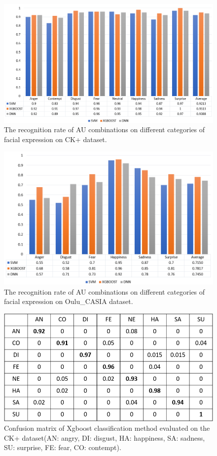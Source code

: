 \documentclass[10pt, conference, compsocconf]{IEEEtran}
\begin{document}
\begin{figure}[h]
	\centering
	\includegraphics[width=\linewidth]{figureck}
	\caption{The recognition rate of AU combinations on different categories of facial expression on CK+ dataset.}
\end{figure}
\begin{figure}[h]
	\centering
	\includegraphics[width=\linewidth]{figureoulu}
	\caption{The recognition rate of AU combinations on different categories of facial expression on Oulu\_CASIA dataset.}
\end{figure}
\begin{figure}[h]
	\centering
	\includegraphics[width=\linewidth]{ConfusionmatrixCK}
	\caption{Confusion matrix of Xgboost classification method evaluated on the CK+ dataset(AN: angry, DI: disgust, HA: happiness, SA: sadness, SU: surprise, FE: fear, CO: contempt).}
\end{figure}
\end{document}
